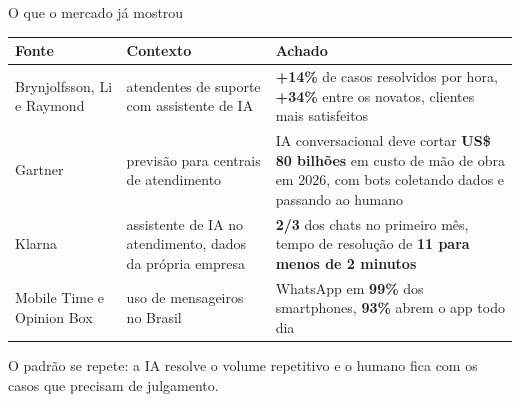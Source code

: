 \documentclass[aspectratio=169,10pt]{beamer}
\begin{document}
\begin{frame}{O que o mercado já mostrou}
  \scriptsize
  \renewcommand{\arraystretch}{1.25}
  \begin{tabularx}{\linewidth}{@{}>{\raggedright\arraybackslash}p{3.0cm} >{\raggedright\arraybackslash}p{3.3cm} X@{}}
    \toprule
    \textbf{Fonte} & \textbf{Contexto} & \textbf{Achado} \\
    \midrule
    Brynjolfsson, Li e Raymond \cite{brynjolfsson2023} & 5.179 atendentes de suporte com assistente de IA & \textbf{+14\%} de casos resolvidos por hora, \textbf{+34\%} entre os novatos, clientes mais satisfeitos \\
    Gartner \cite{gartner2022} & previsão para centrais de atendimento & IA conversacional deve cortar \textbf{US\$ 80 bilhões} em custo de mão de obra em 2026, com bots coletando dados e passando ao humano \\
    Klarna \cite{klarna2024} & assistente de IA no atendimento, dados da própria empresa & \textbf{2/3} dos chats no primeiro mês, tempo de resolução de \textbf{11 para menos de 2 minutos} \\
    Mobile Time e Opinion Box \cite{mobiletime2020} & uso de mensageiros no Brasil & WhatsApp em \textbf{99\%} dos smartphones, \textbf{93\%} abrem o app todo dia \\
    \bottomrule
  \end{tabularx}
  \vfill
  {\small O padrão se repete: a IA resolve o volume repetitivo e o humano fica com os casos que precisam de julgamento.}
\end{frame}
\end{document}

